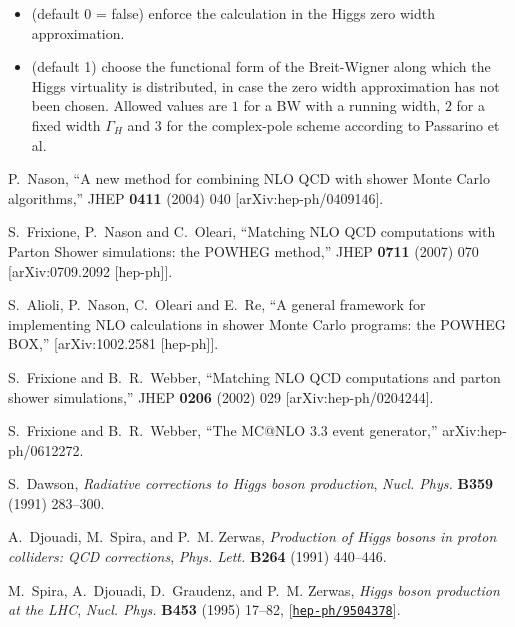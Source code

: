 \documentclass[paper]{JHEP3}
\newcommand{\tmtexttt}[1]{{\ttfamily{#1}}}
\begin{document}
\begin{itemize}
\item{\tmtexttt{zerowidth 1} (default 0 = false) enforce the calculation in the Higgs zero width approximation.
}

\item{\tmtexttt{bwshape 2} (default 1) choose the functional form of the
  Breit-Wigner along which the Higgs virtuality is distributed, in case 
  the zero width approximation has not been chosen. Allowed values are $1$
  for a BW with a running width,  $2$ for a fixed width $\Gamma_H$ and $3$ for the
  complex-pole scheme according to Passarino et al.
}

\end{itemize}

\begin{thebibliography}{10}

  P.~Nason,
``A new method for combining NLO QCD with shower Monte Carlo algorithms,''
  JHEP {\bf 0411} (2004) 040
  [arXiv:hep-ph/0409146].

  S.~Frixione, P.~Nason and C.~Oleari,
``Matching NLO QCD computations with Parton Shower simulations: the POWHEG
method,''
  JHEP {\bf 0711} (2007) 070
  [arXiv:0709.2092 [hep-ph]].


  S.~Alioli, P.~Nason, C.~Oleari and E.~Re,
``A general framework for implementing NLO calculations in shower Monte Carlo
  programs: the POWHEG BOX,''
  [arXiv:1002.2581 [hep-ph]].

  S.~Frixione and B.~R.~Webber,
 ``Matching NLO QCD computations and parton shower simulations,''
  JHEP {\bf 0206} (2002) 029
  [arXiv:hep-ph/0204244].

  S.~Frixione and B.~R.~Webber,
  ``The MC@NLO 3.3 event generator,''
  arXiv:hep-ph/0612272.

S.~Dawson, {\it {Radiative corrections to Higgs boson production}},  {\em Nucl.
  Phys.} {\bf B359} (1991) 283--300.

A.~Djouadi, M.~Spira, and P.~M. Zerwas, {\it {Production of Higgs bosons in
  proton colliders: QCD corrections}},  {\em Phys. Lett.} {\bf B264} (1991)
  440--446.

M.~Spira, A.~Djouadi, D.~Graudenz, and P.~M. Zerwas, {\it {Higgs boson
  production at the LHC}},  {\em Nucl. Phys.} {\bf B453} (1995) 17--82,
  [\href{http://xxx.lanl.gov/abs/hep-ph/9504378}{{\tt hep-ph/9504378}}].




\end{thebibliography}
\end{document}
